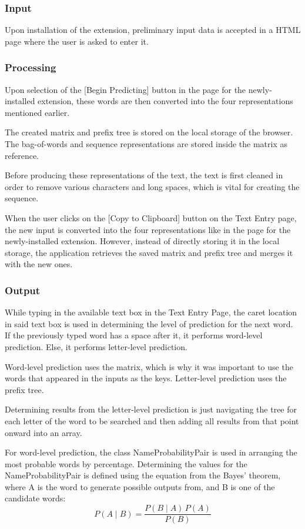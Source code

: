 \documentclass[journal]{./IEEE/IEEEtran}
\begin{document}
\subsubsection{Input}
Upon installation of the extension, preliminary input data is accepted in a HTML page where the user is asked to enter it.

\subsubsection{Processing}
Upon selection of the [Begin Predicting] button in the page for the newly-installed extension, these words are then converted into the four representations mentioned earlier.

The created matrix and prefix tree is stored on the local storage of the browser. The bag-of-words and sequence representations are stored inside the matrix as reference.

Before producing these representations of the text, the text is first cleaned in order to remove various characters and long spaces, which is vital for creating the sequence.

When the user clicks on the [Copy to Clipboard] button on the Text Entry page, the new input is converted into the four representations like in the page for the newly-installed extension. However, instead of directly storing it in the local storage, the application retrieves the saved matrix and prefix tree and merges it with the new ones.

\subsubsection{Output}
While typing in the available text box in the Text Entry Page, the caret location in said text box is used in determining the level of prediction for the next word. If the previously typed word has a space after it, it performs word-level prediction. Else, it performs letter-level prediction.

Word-level prediction uses the matrix, which is why it was important to use the words that appeared in the inputs as the keys. Letter-level prediction uses the prefix tree.

Determining results from the letter-level prediction is just navigating the tree for each letter of the word to be searched and then adding all results from that point onward into an array.

For word-level prediction, the class NameProbabilityPair is used in arranging the most probable words by percentage. Determining the values for the NameProbabilityPair is defined using the equation from the Bayes' theorem, where A is the word to generate possible outputs from, and B is one of the candidate words:
$$ P(A \mid B) = \frac{P(B \mid A) \, P(A)}{P(B)} $$
\end{document}
